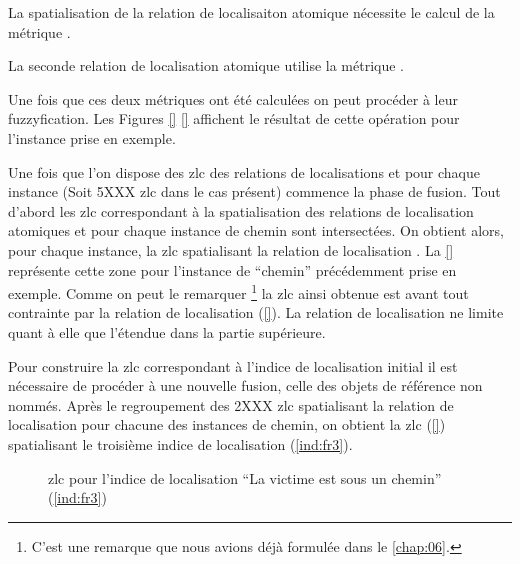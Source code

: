 La spatialisation de la relation de localisaiton atomique
 nécessite le calcul de la métrique
.

La seconde relation de localisation atomique utilise la métrique
.

Une fois que ces deux métriques ont été calculées on peut procéder à
leur fuzzyfication. Les Figures \ref{} \ref{} affichent le résultat de
cette opération pour l'instance prise en exemple.

Une fois que l'on dispose des \ac{zlc} des relations de localisations
 et  pour
chaque instance (Soit 5XXX \ac{zlc} dans le cas présent) commence la
phase de fusion. Tout d'abord les \ac{zlc} correspondant à la
spatialisation des relations de localisation atomiques
 et  pour
chaque instance de chemin sont intersectées. On obtient alors, pour
chaque instance, la \ac{zlc} spatialisant la relation de localisation
. La \autoref{} représente cette zone pour
l'instance de \enquote{chemin} précédemment prise en exemple. Comme on
peut le remarquer \footnote{C'est une remarque que nous avions déjà
  formulée dans le \autoref{chap:06}.} la \ac{zlc} ainsi obtenue est
avant tout contrainte par la relation de localisation
 (\autoref{}). La relation de localisation
 ne limite quant à elle que l'étendue dans
la partie supérieure.

Pour construire la \ac{zlc} correspondant à l'indice de localisation
initial il est nécessaire de procéder à une nouvelle fusion, celle des
objets de référence non nommés.
%
Après le regroupement des 2XXX \ac{zlc} spatialisant la relation de
localisation  pour chacune des instances
de chemin, on obtient la \ac{zlc} (\autoref{}) spatialisant le
troisième indice de localisation (\ref{ind:fr3}).

\begin{figure}
  \centering
  
  \caption{\ac{zlc} pour l'indice de localisation \enquote{La victime
      est sous un chemin} (\ref{ind:fr3})}
\end{figure}


